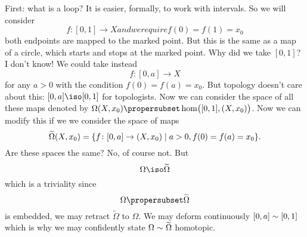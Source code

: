 First: what is a loop? It is easier, formally, to work with
intervals. So we will consider
\begin{subequations}
\begin{equation}
f\colon[0,1]\to X
\end{equation}
and we require 
\begin{equation}
f(0)=f(1)=x_0
\end{equation}
\end{subequations}
both endpoints are mapped to the marked point. But this is the
same as a map of a circle, which starts and stops at the marked
point. Why did we take $[0,1]$? I don't know! We could take
instead
\begin{equation*}
f\colon[0,a]\to X
\end{equation*}
for any $a>0$ with the condition $f(0)=f(a)=x_0$. But topology
doesn't care about this: $[0,a]\iso[0,1]$ for topologists. Now we
can consider the space of all these maps denoted by $\Omega(X,x_0)\propersubset\hom\bigl([0,1],(X,x_0)\bigr)$.%
%
Now we can modify this if we we consider the space of maps
\begin{equation}\index{$\widetilde{\Omega}(X,x_0)$}
\widetilde{\Omega}(X,x_0)=\{ f\colon[0,a]\to(X,x_0)\mid a>0, f(0)=f(a)=x_0\}.
\end{equation}
Are these spaces the same? No, of course not. But
\begin{equation}
\Omega\iso\widetilde{\Omega}
\end{equation}
which is a triviality since
\begin{equation}
\Omega\propersubset\widetilde{\Omega}
\end{equation}
is embedded, we may retract $\widetilde{\Omega}$ to $\Omega$. We
may deform continuously $[0,a]\sim[0,1]$ which is why we
may confidently state $\Omega\sim\widetilde{\Omega}$
homotopic.

